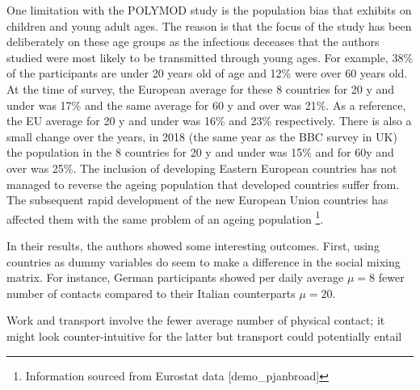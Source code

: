 \documentclass[12pt]{article}
\begin{document}
One limitation with the POLYMOD study is the population bias that exhibits on children and young adult ages. The reason is that the focus of the study has been deliberately on these age groups as the infectious deceases that the authors studied were most likely to be transmitted through young ages. For example, 38\% of the participants are under 20 years old of age and 12\% were over 60 years old. At the time of survey, the European average for these 8 countries for 20 y and under was 17\% and the same average for 60 y and over was 21\%. As a reference, the EU average for 20 y and under was 16\% and 23\% respectively. There is also a small change over the years, in 2018 (the same year as the BBC survey in UK) the population in the 8 countries for 20 y and under was 15\% and for 60y and over was 25\%. The inclusion of developing Eastern European countries has not managed to reverse the ageing population that developed countries suffer from. The subsequent rapid development of the new European Union countries has affected them with the same problem of an ageing population \footnote{Information sourced from Eurostat data [demo\_pjanbroad]}.

In their results, the authors showed some interesting outcomes. First, using countries as dummy variables do seem to make a difference in the social mixing matrix. For instance, German participants showed per daily average $\mu=8$ fewer number of contacts compared to their Italian counterparts $\mu=20$. 

Work and transport involve the fewer average number of physical contact; it might look counter-intuitive for the latter but transport could potentially entail 



\end{document}
